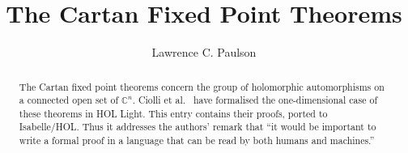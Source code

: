 \documentclass[11pt,a4paper]{report}
\begin{document}
\title{The Cartan Fixed Point Theorems}
\author{Lawrence C. Paulson}
\maketitle

\begin{abstract}
The Cartan fixed point theorems concern the group of holomorphic automorphisms on a connected open set of $\mathbb{C}^n$. Ciolli et al.\ \cite{ciolli-cartan} have formalised the one-dimensional case of these theorems in HOL Light. This entry contains their proofs, ported to Isabelle/HOL\@. Thus it addresses the authors’ remark that ``it would be important to write a formal proof in a language that can be read by both humans and machines.''

\end{abstract}

\tableofcontents





\end{document}
